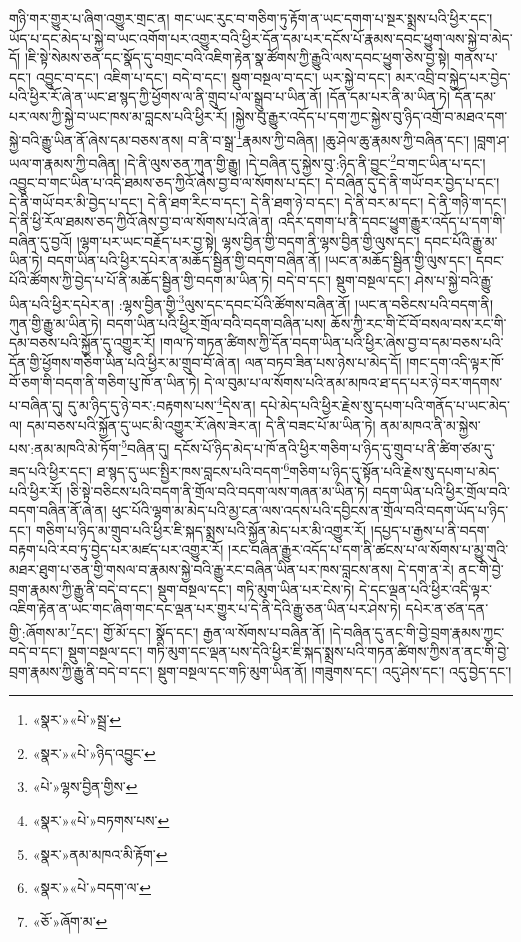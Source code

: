གཉི་གར་གྱུར་པ་ཞིག་འགྱུར་གྲང་ན། གང་ཡང་རུང་བ་གཅིག་ཏུ་རྟོག་ན་ཡང་དགག་པ་སྔར་སྨྲས་པའི་ཕྱིར་དང་། ཡོད་པ་དང་མེད་པ་སྐྱེ་བ་ཡང་འགོག་པར་འགྱུར་བའི་ཕྱིར་དོན་དམ་པར་དངོས་པོ་རྣམས་དབང་ཕྱུག་ལས་སྐྱེ་བ་མེད་དོ། །ཇི་སྟེ་སེམས་ཅན་དང་སྣོད་དུ་བགྲང་བའི་འཇིག་རྟེན་སྣ་ཚོགས་ཀྱི་རྒྱུའི་ལས་དབང་ཕྱུག་ཅེས་བྱ་སྟེ། གནས་པ་དང་། འབྱུང་བ་དང་། འཇིག་པ་དང་། བདེ་བ་དང་། སྡུག་བསྔལ་བ་དང་། ཡར་སྐྱེ་བ་དང་། མར་འབྲི་བ་སྐྱེད་པར་བྱེད་པའི་ཕྱིར་རོ་ཞེ་ན་ཡང་ཐ་སྙད་ཀྱི་ཕྱོགས་ལ་ནི་གྲུབ་པ་ལ་སྒྲུབ་པ་ཡིན་ནོ། །དོན་དམ་པར་ནི་མ་ཡིན་ཏེ། དོན་དམ་པར་ལས་ཀྱི་སྐྱེ་བ་ཡང་ཁས་མ་བླངས་པའི་ཕྱིར་རོ། །སྐྱེས་བུ་རྒྱུར་འདོད་པ་དག་ཀྱང་སྐྱེས་བུ་ཉིད་འགྲོ་བ་མཐའ་དག་སྐྱེ་བའི་རྒྱུ་ཡིན་ནོ་ཞེས་དམ་བཅས་ནས། བ་ནི་བ་སྒྲ་\footnote{«སྣར་»«པེ་»སྦྲ་}རྣམས་ཀྱི་བཞིན། །ཆུ་ཤེལ་ཆུ་རྣམས་ཀྱི་བཞིན་དང་། །བླག་ཤ་ཡལ་ག་རྣམས་ཀྱི་བཞིན། །དེ་ནི་ལུས་ཅན་ཀུན་གྱི་རྒྱུ། །དེ་བཞིན་དུ་སྐྱེས་བུ་:ཉིད་ནི་བྱུང་\footnote{«སྣར་»«པེ་»ཉིད་འབྱུང་}བ་གང་ཡིན་པ་དང་། འབྱུང་བ་གང་ཡིན་པ་འདི་ཐམས་ཅད་ཀྱིའོ་ཞེས་བྱ་བ་ལ་སོགས་པ་དང་། དེ་བཞིན་དུ་དེ་ནི་གཡོ་བར་བྱེད་པ་དང་། དེ་ནི་གཡོ་བར་མི་བྱེད་པ་དང་། དེ་ནི་ཐག་རིང་བ་དང་། དེ་ནི་ཐག་ཉེ་བ་དང་། དེ་ནི་བར་མ་དང་། དེ་ནི་གཉི་ག་དང་། དེ་ནི་ཕྱི་རོལ་ཐམས་ཅད་ཀྱིའོ་ཞེས་བྱ་བ་ལ་སོགས་པའོ་ཞེ་ན། འདིར་དགག་པ་ནི་དབང་ཕྱུག་རྒྱུར་འདོད་པ་དག་གི་བཞིན་དུ་བྱའོ། །ལྷག་པར་ཡང་བརྗོད་པར་བྱ་སྟེ། ལྷས་བྱིན་གྱི་བདག་ནི་ལྷས་བྱིན་གྱི་ལུས་དང་། དབང་པོའི་རྒྱུ་མ་ཡིན་ཏེ། བདག་ཡིན་པའི་ཕྱིར་དཔེར་ན་མཆོད་སྦྱིན་གྱི་བདག་བཞིན་ནོ། །ཡང་ན་མཆོད་སྦྱིན་གྱི་ལུས་དང་། དབང་པོའི་ཚོགས་ཀྱི་བྱེད་པ་པོ་ནི་མཆོད་སྦྱིན་གྱི་བདག་མ་ཡིན་ཏེ། བདེ་བ་དང་། སྡུག་བསྔལ་དང་། ཤེས་པ་སྐྱེ་བའི་རྒྱུ་ཡིན་པའི་ཕྱིར་དཔེར་ན། :ལྷས་བྱིན་གྱི་\footnote{«པེ་»ལྷས་བྱིན་གྱིས་}ལུས་དང་དབང་པོའི་ཚོགས་བཞིན་ནོ། །ཡང་ན་བཅིངས་པའི་བདག་ནི། ཀུན་གྱི་རྒྱུ་མ་ཡིན་ཏེ། བདག་ཡིན་པའི་ཕྱིར་གྲོལ་བའི་བདག་བཞིན་པས། ཆོས་ཀྱི་རང་གི་ངོ་བོ་བསལ་བས་རང་གི་དམ་བཅས་པའི་སྐྱོན་དུ་འགྱུར་རོ། །གལ་ཏེ་གཏན་ཚིགས་ཀྱི་དོན་བདག་ཡིན་པའི་ཕྱིར་ཞེས་བྱ་བ་དམ་བཅས་པའི་དོན་གྱི་ཕྱོགས་གཅིག་ཡིན་པའི་ཕྱིར་མ་གྲུབ་བོ་ཞེ་ན། ལན་བཏབ་ཟིན་པས་ཉེས་པ་མེད་དོ། །གང་དག་འདི་ལྟར་ཁོ་བོ་ཅག་གི་བདག་ནི་གཅིག་པུ་ཁོ་ན་ཡིན་ཏེ། དེ་ལ་བུམ་པ་ལ་སོགས་པའི་ནམ་མཁའ་ཐ་དད་པར་ཉེ་བར་གདགས་པ་བཞིན་དུ། དུ་མ་ཉིད་དུ་ཉེ་བར་:བརྟགས་པས་\footnote{«སྣར་»«པེ་»བཏགས་པས་}དེས་ན། དཔེ་མེད་པའི་ཕྱིར་རྗེས་སུ་དཔག་པའི་གནོད་པ་ཡང་མེད་ལ། དམ་བཅས་པའི་སྐྱོན་དུ་ཡང་མི་འགྱུར་རོ་ཞེས་ཟེར་ན། དེ་ནི་བཟང་པོ་མ་ཡིན་ཏེ། ནམ་མཁའ་ནི་མ་སྐྱེས་པས་:ནམ་མཁའི་མེ་ཏོག་\footnote{«སྣར་»ནམ་མཁའ་མི་རྟོག་}བཞིན་དུ། དངོས་པོ་ཉིད་མེད་པ་ཁོ་ནའི་ཕྱིར་གཅིག་པ་ཉིད་དུ་གྲུབ་པ་ནི་ཚིག་ཙམ་དུ་ཟད་པའི་ཕྱིར་དང་། ཐ་སྙད་དུ་ཡང་སྤྱིར་ཁས་བླངས་པའི་བདག་\footnote{«སྣར་»«པེ་»བདག་ལ་}གཅིག་པ་ཉིད་དུ་སྟོན་པའི་རྗེས་སུ་དཔག་པ་མེད་པའི་ཕྱིར་རོ། །ཅི་སྟེ་བཅིངས་པའི་བདག་ནི་གྲོལ་བའི་བདག་ལས་གཞན་མ་ཡིན་ཏེ། བདག་ཡིན་པའི་ཕྱིར་གྲོལ་བའི་བདག་བཞིན་ནོ་ཞེ་ན། ཕུང་པོའི་ལྷག་མ་མེད་པའི་མྱ་ངན་ལས་འདས་པའི་དབྱིངས་ན་གྲོལ་བའི་བདག་ཡོད་པ་ཉིད་དང་། གཅིག་པ་ཉིད་མ་གྲུབ་པའི་ཕྱིར་ཇི་སྐད་སྨྲས་པའི་སྐྱོན་མེད་པར་མི་འགྱུར་རོ། །དཔྱད་པ་རྒྱས་པ་ནི་བདག་བརྟག་པའི་རབ་ཏུ་བྱེད་པར་མཛད་པར་འགྱུར་རོ། །རང་བཞིན་རྒྱུར་འདོད་པ་དག་ནི་ཚངས་པ་ལ་སོགས་པ་མྱུ་གུའི་མཐར་ཐུག་པ་ཅན་གྱི་གསལ་བ་རྣམས་སྐྱེ་བའི་རྒྱུ་རང་བཞིན་ཡིན་པར་ཁས་བླངས་ནས། དེ་དག་ན་རེ། ནང་གི་བྱེ་བྲག་རྣམས་ཀྱི་རྒྱུ་ནི་བདེ་བ་དང་། སྡུག་བསྔལ་དང་། གཏི་མུག་ཡིན་པར་ངེས་ཏེ། དེ་དང་ལྡན་པའི་ཕྱིར་འདི་ལྟར་འཇིག་རྟེན་ན་ཡང་གང་ཞིག་གང་དང་ལྡན་པར་གྱུར་པ་དེ་ནི་དེའི་རྒྱུ་ཅན་ཡིན་པར་ཤེས་ཏེ། དཔེར་ན་ཙན་དན་གྱི་:ཞོགས་མ་\footnote{«ཅོ་»ཞོག་མ་}དང་། གྱོ་མོ་དང་། སྣོད་དང་། རྒྱན་ལ་སོགས་པ་བཞིན་ནོ། །དེ་བཞིན་དུ་ནང་གི་བྱེ་བྲག་རྣམས་ཀྱང་བདེ་བ་དང་། སྡུག་བསྔལ་དང་། གཏི་མུག་དང་ལྡན་པས་དེའི་ཕྱིར་ཇི་སྐད་སྨྲས་པའི་གཏན་ཚིགས་ཀྱིས་ན་ནང་གི་བྱེ་བྲག་རྣམས་ཀྱི་རྒྱུ་ནི་བདེ་བ་དང་། སྡུག་བསྔལ་དང་གཏི་མུག་ཡིན་ནོ། །གཟུགས་དང་། འདུ་ཤེས་དང་། འདུ་བྱེད་དང་། 